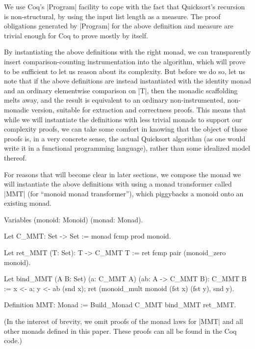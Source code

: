 \documentclass[runningheads]{llncs}
\begin{document}
We use Coq's |Program| facility \cite{subsetcoercions} to cope with the fact that Quicksort's recursion is non-structural, by using the input list length as a measure. The proof obligations generated by |Program| for the above definition and measure are trivial enough for Coq to prove mostly by itself.

By instantiating the above definitions with the right monad, we can transparently insert comparison-counting instrumentation into the algorithm, which will prove to be sufficient to let us reason about its complexity. But before we do so, let us note that if the above definitions are instead instantiated with the identity monad and an ordinary elementwise comparison on |T|, then the monadic scaffolding melts away, and the result is equivalent to an ordinary non-instrumented, non-monadic version, suitable for extraction and correctness proofs. This means that while we will instantiate the definitions with less trivial monads to support our complexity proofs, we can take some comfort in knowing that the object of those proofs is, in a very concrete sense, the actual Quicksort algorithm (as one would write it in a functional programming language), rather than some idealized model thereof.

For reasons that will become clear in later sections, we compose the monad we will instantiate the above definitions with using a monad transformer called |MMT| (for ``monoid monad transformer''), which piggybacks a monoid onto an existing monad.

\begin{code}
  Variables (monoid: Monoid) (monad: Monad).

  Let C_MMT: Set -> Set := monad fcmp prod monoid.

  Let ret_MMT (T: Set): T -> C_MMT T := ret fcmp pair (monoid_zero monoid).

  Let bind_MMT (A B: Set) (a: C_MMT A) (ab: A -> C_MMT B): C_MMT B :=
    x <- a; y <- ab (snd x); ret (monoid_mult monoid (fst x) (fst y), snd y).

  Definition MMT: Monad := Build_Monad C_MMT bind_MMT ret_MMT.
\end{code}
(In the interest of brevity, we omit proofs of the monad laws for |MMT| and all other monads defined in this paper. These proofs can all be found in the Coq code.)
\end{document}

